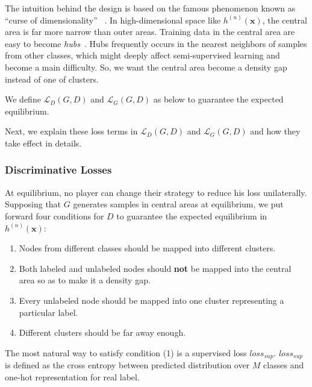The intuition behind the design is based on the famous phenomenon known as ``curse of dimensionality'' ~\cite{donoho2000high}. In high-dimensional space like $h^{(n)}(\mathbf{x})$, the central area is far more narrow than outer areas. Training data in the central area are easy to become \emph{hubs}~\cite{radovanovic2010hubs}. Hubs frequently occurs in the nearest neighbors of samples from other classes, which might deeply affect semi-supervised learning and become a main difficulty. So, we want the central area become a density gap instead of one of clusters.

We define $\mathcal{L}_D(G, D)$ and $\mathcal{L}_G(G, D)$ as below to guarantee the expected equilibrium.


\noindent Next, we explain these loss terms in $\mathcal{L}_D(G, D)$ and $\mathcal{L}_G(G, D)$ and how they take effect in details.

\subsubsection{Discriminative Losses}\label{LD} 
At equilibrium, no player can change their strategy to reduce his loss unilaterally. Supposing that $G$ generates samples in central areas at equilibrium, we put forward four conditions for $D$ to guarantee the expected equilibrium in $h^{(n)}(\mathbf{x})$:

\begin{enumerate}
\item Nodes from different classes should be mapped into different clusters.
\item Both labeled and unlabeled nodes should \textbf{not} be mapped into the central area so as to make it a density gap.
\item Every unlabeled node should be mapped into one cluster representing a particular label.
\item Different clusters should be far away enough.
\end{enumerate}

The most natural way to satisfy condition (1) is a supervised loss $loss_{sup}$. $loss_{sup}$ is defined as the cross entropy between predicted distribution over $M$ classes and one-hot representation for real label. 
    
